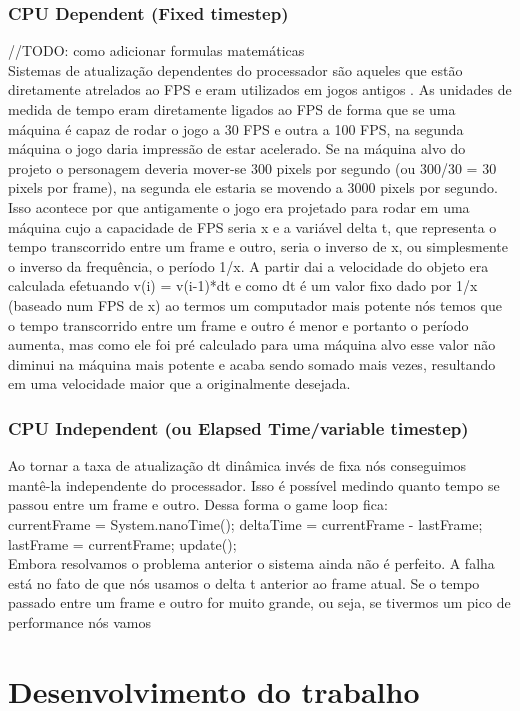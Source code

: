 \documentclass[12pt, 
openright, 
oneside, 
a4paper,    
brazil]{facom-ufu-abntex2}
\begin{document}
\subsection{CPU Dependent (Fixed timestep)}
//TODO: como adicionar formulas matemáticas\\
Sistemas de atualização dependentes do processador são aqueles que estão diretamente atrelados ao FPS e eram utilizados em jogos antigos \cite{GameEngineArchitecture}. As unidades de medida de tempo eram diretamente ligados ao FPS de forma que se uma máquina é capaz de rodar o jogo a 30 FPS e outra a 100 FPS, na segunda máquina o jogo daria impressão de estar acelerado. Se na máquina alvo do projeto o personagem deveria mover-se 300 pixels por segundo (ou 300/30 = 30 pixels por frame), na segunda ele estaria se movendo a 3000 pixels por segundo. Isso acontece por que antigamente o jogo era projetado para rodar em uma máquina cujo a capacidade de FPS seria x e a variável delta t, que representa o tempo transcorrido entre um frame e outro, seria o inverso de x, ou simplesmente o inverso da frequência, o período 1/x. A partir dai a velocidade do objeto era calculada efetuando v(i) = v(i-1)*dt e como dt é um valor fixo dado por 1/x (baseado num FPS de x) ao termos um computador mais potente nós temos que o tempo transcorrido entre um frame e outro é menor e portanto o período aumenta, mas como ele foi pré calculado para uma máquina alvo esse valor não diminui na máquina mais potente e acaba sendo somado mais vezes, resultando em uma velocidade maior que a originalmente desejada.
 
\subsection{CPU Independent (ou Elapsed Time/variable timestep)}
Ao tornar a taxa de atualização dt dinâmica invés de fixa nós conseguimos mantê-la independente do processador. Isso é possível medindo quanto tempo se passou entre um frame e outro. Dessa forma o game loop fica:\\
currentFrame = System.nanoTime(); 
		deltaTime = currentFrame - lastFrame;
		lastFrame = currentFrame;
		update();\\
Embora resolvamos o problema anterior o sistema ainda não é perfeito. A falha está no fato de que nós usamos o delta t anterior ao frame atual. Se o tempo passado entre um frame e outro for muito grande, ou seja, se tivermos um pico de performance nós vamos 
 
\chapter{Desenvolvimento do trabalho}
\label{sec:desenv}
\end{document}

